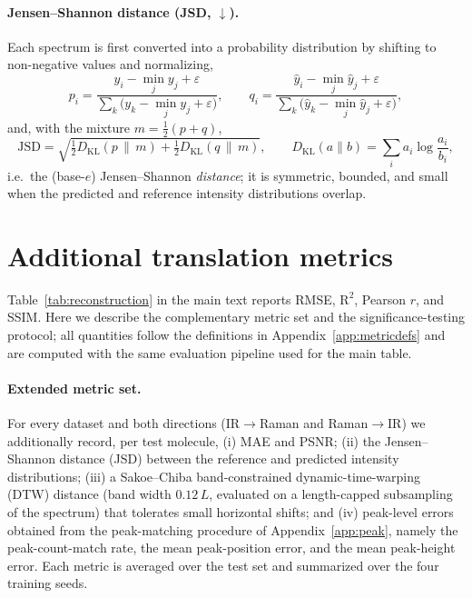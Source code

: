 \documentclass[pdflatex,sn-mathphys-num]{sn-jnl}%
\theoremstyle{thmstyleone}%
\theoremstyle{thmstyletwo}%
\theoremstyle{thmstylethree}%
\begin{document}
\begin{appendices}
\paragraph{Jensen--Shannon distance (JSD, \texorpdfstring{$\downarrow$}{down}).}
Each spectrum is first converted into a probability distribution by shifting to non-negative values and normalizing,
\[
p_i=\frac{y_i-\min_j y_j+\varepsilon}{\sum_{k}\bigl(y_k-\min_j y_j+\varepsilon\bigr)},
\qquad
q_i=\frac{\hat y_i-\min_j \hat y_j+\varepsilon}{\sum_{k}\bigl(\hat y_k-\min_j \hat y_j+\varepsilon\bigr)},
\]
and, with the mixture $m=\tfrac12(p+q)$,
\[
\mathrm{JSD}=\sqrt{\tfrac{1}{2}D_{\mathrm{KL}}(p\,\|\,m)+\tfrac{1}{2}D_{\mathrm{KL}}(q\,\|\,m)},
\qquad
D_{\mathrm{KL}}(a\|b)=\sum_i a_i\log\frac{a_i}{b_i},
\]
i.e.\ the (base-$e$) Jensen--Shannon \emph{distance}; it is symmetric, bounded, and small when the predicted and reference intensity distributions overlap.

\section{Additional translation metrics}\label{app:metrics}
Table~\ref{tab:reconstruction} in the main text reports RMSE, $\text{R}^2$, Pearson $r$, and SSIM. Here we describe the complementary metric set and the significance-testing protocol; all quantities follow the definitions in Appendix~\ref{app:metricdefs} and are computed with the same evaluation pipeline used for the main table.

\paragraph{Extended metric set.} For every dataset and both directions (IR$\rightarrow$Raman and Raman$\rightarrow$IR) we additionally record, per test molecule, (i) MAE and PSNR; (ii) the Jensen--Shannon distance (JSD) between the reference and predicted intensity distributions; (iii) a Sakoe--Chiba band-constrained dynamic-time-warping (DTW) distance (band width $0.12\,L$, evaluated on a length-capped subsampling of the spectrum) that tolerates small horizontal shifts; and (iv) peak-level errors obtained from the peak-matching procedure of Appendix~\ref{app:peak}, namely the peak-count-match rate, the mean peak-position error, and the mean peak-height error. Each metric is averaged over the test set and summarized over the four training seeds.


\end{appendices}
\end{document}
